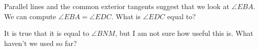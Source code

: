 


Parallel lines and the common exterior tangents suggest that we look at $\angle EBA$. We can compute $\angle EBA = \angle EDC$. What is $\angle EDC$ equal to?











It is true that it is equal to $\angle BNM$, but I am not sure how useful this is. What haven't we used so far?








